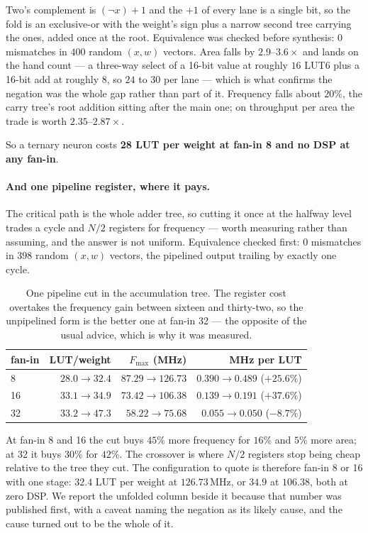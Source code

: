 \documentclass[11pt]{article}
\theoremstyle{definition}
\begin{document}
Two's complement is $(\lnot x)+1$ and the $+1$ of every lane is a single bit, so
the fold is an exclusive-or with the weight's sign plus a narrow second tree
carrying the ones, added once at the root. Equivalence was checked before
synthesis: $0$ mismatches in $400$ random $(x,w)$ vectors. Area falls by
$2.9$--$3.6\times$ and lands on the hand count --- a three-way select of a
16-bit value at roughly $16$ LUT6 plus a 16-bit add at roughly $8$, so $24$ to
$30$ per lane --- which is what confirms the negation was the whole gap rather
than part of it. Frequency falls about $20\%$, the carry tree's root addition
sitting after the main one; on throughput per area the trade is worth
$2.35$--$2.87\times$.

So a ternary neuron costs \textbf{28 LUT per weight at fan-in 8 and no DSP at
any fan-in}.

\paragraph{And one pipeline register, where it pays.} The critical path is the
whole adder tree, so cutting it once at the halfway level trades a cycle and
$N/2$ registers for frequency --- worth measuring rather than assuming, and the
answer is not uniform. Equivalence checked first: $0$ mismatches in $398$ random
$(x,w)$ vectors, the pipelined output trailing by exactly one cycle.

\begin{table}[t]\centering
\caption{One pipeline cut in the accumulation tree. The register cost overtakes
the frequency gain between sixteen and thirty-two, so the unpipelined form is
the better one at fan-in 32 --- the opposite of the usual advice, which is why it
was measured.}
\label{tab:nodepipe}
\begin{tabular}{lrrr}
\toprule
fan-in & LUT/weight & $F_{\max}$ (MHz) & MHz per LUT \\
\midrule
8  & $28.0\to\mathbf{32.4}$ & $87.29\to\mathbf{126.73}$ & $0.390\to0.489$ (\textbf{$+25.6\%$}) \\
16 & $33.1\to\mathbf{34.9}$ & $73.42\to\mathbf{106.38}$ & $0.139\to0.191$ (\textbf{$+37.6\%$}) \\
32 & $33.2\to47.3$ & $58.22\to75.68$ & $0.055\to0.050$ ($-8.7\%$) \\
\bottomrule
\end{tabular}
\end{table}

At fan-in 8 and 16 the cut buys $45\%$ more frequency for $16\%$ and $5\%$ more
area; at 32 it buys $30\%$ for $42\%$. The crossover is where $N/2$ registers
stop being cheap relative to the tree they cut. The configuration to quote is
therefore fan-in 8 or 16 with one stage: $32.4$ LUT per weight at $126.73$\,MHz,
or $34.9$ at $106.38$, both at zero DSP. We report the unfolded column beside it because that number was
published first, with a caveat naming the negation as its likely cause, and the
cause turned out to be the whole of it.
\end{document}

